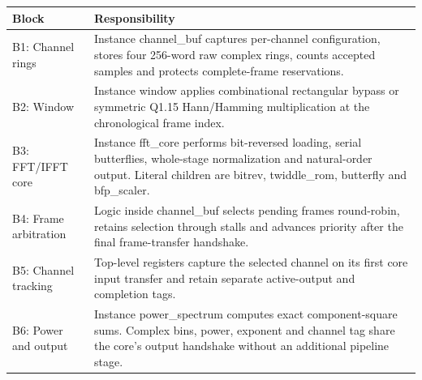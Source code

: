 \documentclass[11pt,a4paper]{article}
\begin{document}
{\small\renewcommand{\arraystretch}{1.18}\begin{longtable}{@{}L{0.24\textwidth}|L{0.7\textwidth}@{}}\toprule

\textbf{Block} & \textbf{Responsibility}\\\midrule\endhead

B1: Channel rings & Instance channel\_\allowbreak{}buf captures per-channel configuration,\allowbreak{} stores four 256-word raw complex rings,\allowbreak{} counts accepted samples and protects complete-frame reservations.\\[2pt]\hline

B2: Window & Instance window applies combinational rectangular bypass or symmetric Q1.15 Hann/\allowbreak{}Hamming multiplication at the chronological frame index.\\[2pt]\hline

B3: FFT/\allowbreak{}IFFT core & Instance fft\_\allowbreak{}core performs bit-reversed loading,\allowbreak{} serial butterflies,\allowbreak{} whole-stage normalization and natural-order output. Literal children are bitrev,\allowbreak{} twiddle\_\allowbreak{}rom,\allowbreak{} butterfly and bfp\_\allowbreak{}scaler.\\[2pt]\hline

B4: Frame arbitration & Logic inside channel\_\allowbreak{}buf selects pending frames round-robin,\allowbreak{} retains selection through stalls and advances priority after the final frame-transfer handshake.\\[2pt]\hline

B5: Channel tracking & Top-level registers capture the selected channel on its first core input transfer and retain separate active-output and completion tags.\\[2pt]\hline

B6: Power and output & Instance power\_\allowbreak{}spectrum computes exact component-square sums. Complex bins,\allowbreak{} power,\allowbreak{} exponent and channel tag share the core's output handshake without an additional pipeline stage.\\[2pt]\hline

\bottomrule\end{longtable}}
\end{document}
